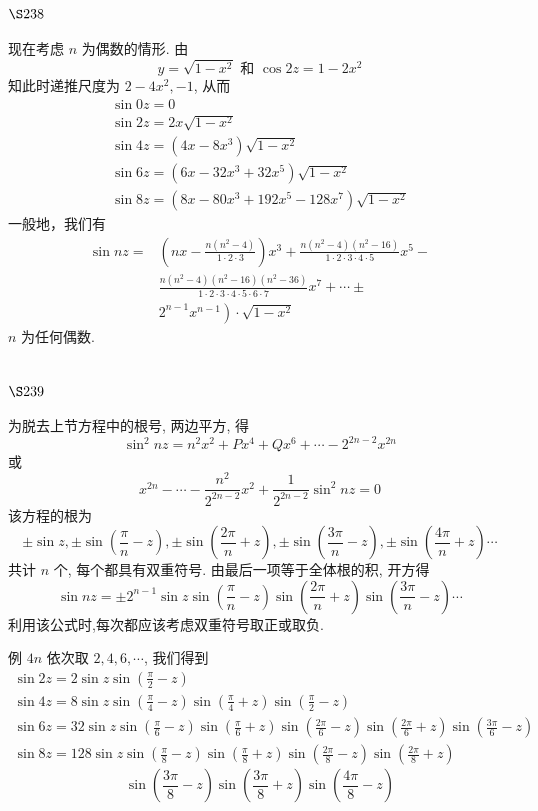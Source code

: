\section{$\S 238$}

现在考虑 $n$ 为偶数的情形. 由 
\[
y=\sqrt{1-x^{2}} \text { 和 } \cos 2 z=1-2 x^{2}
\]
知此时递推尺度为 $2-4 x^{2},-1$, 从而
\[
\begin{gathered}
\sin 0 z=0 \\
\sin 2 z=2 x \sqrt{1-x^{2}} \\
\sin 4 z=\left(4 x-8 x^{3}\right) \sqrt{1-x^{2}} \\
\sin 6 z=\left(6 x-32 x^{3}+32 x^{5}\right) \sqrt{1-x^{2}} \\
\sin 8 z=\left(8 x-80 x^{3}+192 x^{5}-128 x^{7}\right) \sqrt{1-x^{2}}
\end{gathered}
\]
一般地，我们有
\[
\begin{aligned}
\sin n z= & \left(n x-\frac{n\left(n^{2}-4\right)}{1 \cdot 2 \cdot 3}\right) x^{3}+\frac{n\left(n^{2}-4\right)\left(n^{2}-16\right)}{1 \cdot 2 \cdot 3 \cdot 4 \cdot 5} x^{5}- \\
& \frac{n\left(n^{2}-4\right)\left(n^{2}-16\right)\left(n^{2}-36\right)}{1 \cdot 2 \cdot 3 \cdot 4 \cdot 5 \cdot 6 \cdot 7} x^{7}+\cdots \pm \\
& \left.2^{n-1} x^{n-1}\right) \cdot \sqrt{1-x^{2}}
\end{aligned}
\]
$n$ 为任何偶数.

\section{$\S 239$}

为脱去上节方程中的根号, 两边平方, 得
\[
\sin ^{2} n z=n^{2} x^{2}+P x^{4}+Q x^{6}+\cdots-2^{2 n-2} x^{2 n}
\]
或
\[
x^{2 n}-\cdots-\frac{n^{2}}{2^{2 n-2}} x^{2}+\frac{1}{2^{2 n-2}} \sin ^{2} n z=0
\]
该方程的根为
\[
\pm \sin z, \pm \sin \left(\frac{\pi}{n}-z\right), \pm \sin \left(\frac{2 \pi}{n}+z\right), \pm \sin \left(\frac{3 \pi}{n}-z\right), \pm \sin \left(\frac{4 \pi}{n}+z\right) \cdots
\]
共计 $n$ 个, 每个都具有双重符号. 由最后一项等于全体根的积, 开方得
\[
\sin n z=\pm 2^{n-1} \sin z \sin \left(\frac{\pi}{n}-z\right) \sin \left(\frac{2 \pi}{n}+z\right) \sin \left(\frac{3 \pi}{n}-z\right) \cdots
\]
利用该公式时,每次都应该考虑双重符号取正或取负.

例 $4 n$ 依次取 $2,4,6, \cdots$, 我们得到
\[
\begin{gathered}
\sin 2 z=2 \sin z \sin \left(\frac{\pi}{2}-z\right) \\
\sin 4 z=8 \sin z \sin \left(\frac{\pi}{4}-z\right) \sin \left(\frac{\pi}{4}+z\right) \sin \left(\frac{\pi}{2}-z\right) \\
\sin 6 z=32 \sin z \sin \left(\frac{\pi}{6}-z\right) \sin \left(\frac{\pi}{6}+z\right) \sin \left(\frac{2 \pi}{6}-z\right) \sin \left(\frac{2 \pi}{6}+z\right) \sin \left(\frac{3 \pi}{6}-z\right) \\
\sin 8 z=128 \sin z \sin \left(\frac{\pi}{8}-z\right) \sin \left(\frac{\pi}{8}+z\right) \sin \left(\frac{2 \pi}{8}-z\right) \sin \left(\frac{2 \pi}{8}+z\right)
\end{gathered}
\]
\[
\sin \left(\frac{3 \pi}{8}-z\right) \sin \left(\frac{3 \pi}{8}+z\right) \sin \left(\frac{4 \pi}{8}-z\right) 
\]
